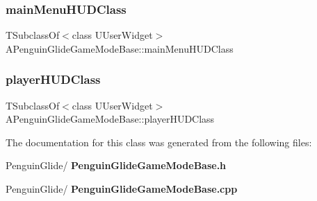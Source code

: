 \mbox{\label{class_a_penguin_glide_game_mode_base_a23ac27f19126405cc41c2bc02ef2f0e8}} 
\subsubsection{mainMenuHUDClass}
{\footnotesize\ttfamily T\+Subclass\+Of$<$class U\+User\+Widget$>$ A\+Penguin\+Glide\+Game\+Mode\+Base\+::main\+Menu\+H\+U\+D\+Class\hspace{0.3cm}{\ttfamily [protected]}}

\mbox{\label{class_a_penguin_glide_game_mode_base_ad1a642f5b944d76adb1658940dc8617c}} 
\subsubsection{playerHUDClass}
{\footnotesize\ttfamily T\+Subclass\+Of$<$class U\+User\+Widget$>$ A\+Penguin\+Glide\+Game\+Mode\+Base\+::player\+H\+U\+D\+Class\hspace{0.3cm}{\ttfamily [protected]}}



The documentation for this class was generated from the following files\+:\begin{DoxyCompactItemize}
\item 
Penguin\+Glide/\textbf{ Penguin\+Glide\+Game\+Mode\+Base.\+h}\item 
Penguin\+Glide/\textbf{ Penguin\+Glide\+Game\+Mode\+Base.\+cpp}\end{DoxyCompactItemize}
